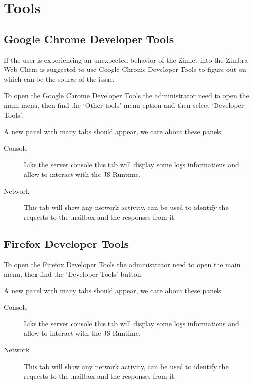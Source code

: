 \section{Tools}
\label{==sect:tools==}

\subsection{Google Chrome Developer Tools}

    If the user is experiencing an unexpected behavior of the Zimlet into the Zimbra Web Client is suggested to use
    Google Chrome Developer Tools to figure out on which can be the source of the issue.

    To open the Google Chrome Developer Tools the administrator need to open the main menu, then find the `Other tools'
    menu option and then select `Developer Tools'.

    A new panel with many tabs should appear, we care about these panels:
    \begin{description}
        \item [Console] Like the server console this tab will display some logs informations and allow to interact with
            the JS Runtime.
        \item [Network] This tab will show any network activity, can be used to identify the requests to the mailbox and
            the responses from it.
    \end{description}

\subsection{Firefox Developer Tools}

    To open the Firefox Developer Tools the administrator need to open the main menu, then find the `Developer Tools'
    button.

    A new panel with many tabs should appear, we care about these panels:
    \begin{description}
        \item [Console] Like the server console this tab will display some logs informations and allow to interact with
            the JS Runtime.
        \item [Network] This tab will show any network activity, can be used to identify the requests to the mailbox and
            the responses from it.
    \end{description}
